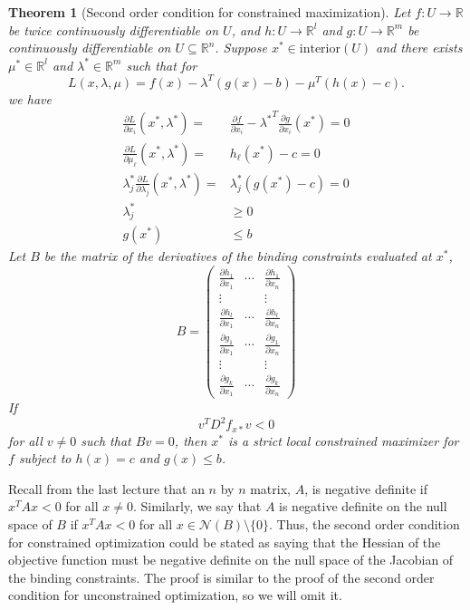 \documentclass[12pt,reqno]{amsart}
\newtheorem{theorem}{Theorem}[section]
\theoremstyle{definition}
\def\R{\mathbb{R}}
\renewcommand{\to}{{\rightarrow}}
\begin{document}
\begin{theorem}[Second order condition for constrained maximization]
  Let $f:U \to \R$ be twice continuously
  differentiable on $U$, and $h:U \to \R^l$ and $g: U \to \R^m$ be
  continuously differentiable on $U \subseteq \R^n$. Suppose $x^* \in    
  \mathrm{interior}(U)$ and there exists
  $\mu^* \in \R^l$ and $\lambda^* \in \R^m$ such that for 
  \[ L(x,\lambda,\mu) = f(x) - \lambda^T (g(x) - b) - \mu^T(h(x) - c). \]
  we have
  \begin{align*}
    \frac{\partial L}{\partial x_i}(x^*,\lambda^*) = & \frac{\partial
      f}{\partial x_i} - {\lambda^*}^T \frac{\partial g}{\partial
      x_i}(x^*) = 0 \\
    \frac{\partial L}{\partial \mu_\ell}(x^*,\lambda^*) = & h_\ell(x^*) - c = 0 \\
    \lambda_j^* \frac{\partial L}{\partial \lambda_j}(x^*,\lambda^*) =
    & \lambda_j^* \left(g(x^*) - c \right)= 0 \\
    \lambda_j^* & \geq 0 \\
    g(x^*) & \leq b
  \end{align*}
  Let $B$ be the matrix of the derivatives of the binding constraints
  evaluated at $x^*$,
  \[ B = \begin{pmatrix} 
    \frac{\partial h_1}{\partial x_1} &  \cdots &\frac{\partial
      h_1}{\partial x_n}  \\
    \vdots & & \vdots \\
    \frac{\partial h_l}{\partial x_1} &  \cdots &\frac{\partial
      h_l}{\partial x_n}  \\    
    \frac{\partial g_1}{\partial x_1} &  \cdots &\frac{\partial
      g_1}{\partial x_n}  \\ 
    \vdots & & \vdots \\
    \frac{\partial g_k}{\partial x_1} &  \cdots &\frac{\partial
      g_k}{\partial x_n}  
  \end{pmatrix}
  \]
  If 
  \[ v^T D^2 f_{x*} v < 0 \]
  for all $v \neq 0$ such that $B v = 0$, then $x^*$ is a strict
  local constrained maximizer for $f$ subject to $h(x) = c$ and $g(x)
  \leq b$. 
\end{theorem}
Recall from the last lecture that an $n$ by $n$ matrix, $A$, is
negative definite if $x^T A x < 0$ for all $x \neq 0$. Similarly, we
say that $A$ is negative definite on the null space of $B$ if $x^T A x
< 0$ for all $x \in \mathcal{N}(B) \setminus\{0\}$. Thus, the second
order condition for constrained optimization could be stated as saying
that the Hessian of the objective function must be negative definite
on the null space of the Jacobian of the binding constraints. The
proof is similar to the proof of the second order condition for
unconstrained optimization, so we will omit it. 
\end{document}

